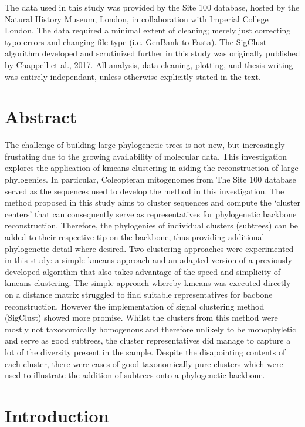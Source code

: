 \documentclass[12pt]{article}
\begin{document}
The data used in this study was provided by the Site 100 database, hosted by the Natural History Museum, London, in collaboration with Imperial College London. The data required a minimal extent of cleaning; merely just correcting typo errors and changing file type (i.e. GenBank to Fasta). The SigClust algorithm developed and scrutinized further in this study was originally published by Chappell et al., 2017. All analysis, data cleaning, plotting, and thesis writing was entirely independant, unless otherwise explicitly stated in the text. 

\newpage
\tableofcontents

  \newpage
  \section{Abstract}
  The challenge of building large phylogenetic trees is not new, but increasingly frustating due to the growing availability of molecular data. This investigation explores the application of kmeans clustering in aiding the reconstruction of large phylogenies. In particular, Coleopteran mitogenomes from The Site 100 database served as the sequences used to develop the method in this investigation. The method proposed in this study aims to cluster sequences and compute the `cluster centers' that can consequently serve as representatives for phylogenetic backbone reconstruction. Therefore, the phylogenies of individual clusters (subtrees) can be added to their respective tip on the backbone, thus providing additional phylogenetic detail where desired. Two clustering approaches were experimented in this study: a simple kmeans approach and an adapted version of a previously developed algorithm that also takes advantage of the speed and simplicity of kmeans clustering. The simple approach whereby kmeans was executed directly on a distance matrix struggled to find suitable representatives for bacbone reconstruction. However the implementation of signal clustering method (SigClust) showed more promise. Whilst the clusters from this method  were mostly not taxonomically homogenous and therefore unlikely to be monophyletic and serve as good subtrees, the cluster representatives did manage to capture a lot of the diversity present in the sample. Despite the disapointing contents of each cluster, there were cases of good taxonomically pure clusters which were used to illustrate the addition of subtrees onto a phylogenetic backbone. 
  
  \newpage
  \section{Introduction}
    
\end{document}
